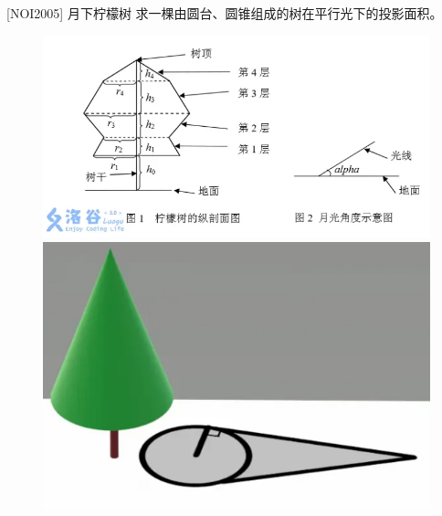 \documentclass{beamer}
\begin{document}
\begin{frame}{[NOI2005] 月下柠檬树}
    求一棵由圆台、圆锥组成的树在平行光下的投影面积。

    \begin{figure}[H]
        \begin{minipage}[t]{0.49\textwidth}
            \centering
            \includegraphics[width=\textwidth]{pic/noi2005.png}
        \end{minipage}
        \begin{minipage}[t]{0.49\textwidth}
            \centering
            \includegraphics[width=\textwidth]{pic/noi2005-2.png}
        \end{minipage}
    \end{figure}

\end{frame}
\end{document}
